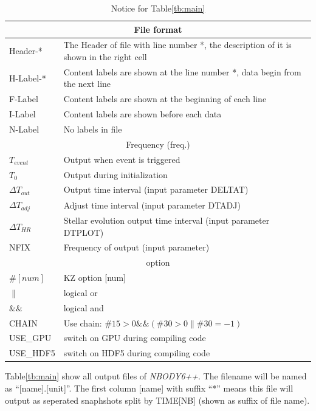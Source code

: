 \begin{longtable}{|p{0.7in}|p{4.3in}|}
  \caption{Notice for Table\ref{tb:main}}
  \\\hline
  \multicolumn{2}{|c|}{ File format } \\\hline    
    Header-*   & The Header of file with line number *, the description of it is shown in the right cell \\\hline
    H-Label-*  & Content labels are shown at the line number *, data begin from the next line\\\hline
    F-Label    & Content labels are shown at the beginning of each line \\\hline
    I-Label    & Content labels are shown before each data \\\hline
    N-Label    & No labels in file \\\hline
    \hline

    \multicolumn{2}{|c|}{ Frequency (freq.) } \\\hline
    $T_{event}$ & Output when event is triggered \\\hline
    $T_0$ & Output during initialization \\\hline
    $\Delta T_{out}$ & Output time interval (input parameter DELTAT) \\\hline
    $\Delta T_{adj}$ & Adjust time interval (input parameter DTADJ) \\\hline
    $\Delta T_{HR}$  & Stellar evolution output time interval (input parameter DTPLOT) \\\hline
    NFIX & Frequency of output (input parameter) \\\hline

    \multicolumn{2}{|c|}{ option } \\\hline
    $\#[num]$ & KZ option [num]\\\hline
    $\|$ & logical or \\\hline
    $\&\&$ & logical and \\\hline
    CHAIN & Use chain:  $\#15>0 \&\& (\#30>0 \| \#30=-1)$ \\\hline
    USE\_GPU & switch on GPU during compiling code \\\hline
    USE\_HDF5 & switch on HDF5 during compiling code \\\hline

\end{longtable}

Table\ref{tb:main} show all output files of \textit{NBODY6++}. The filename will be named as ``[name].[unit]''. The first column [name] with suffix ``*'' means this file will output as seperated snaphshots split by TIME[NB] (shown as suffix of file name). 

